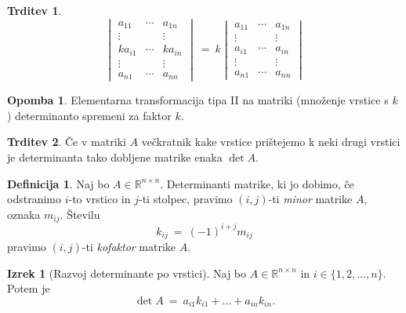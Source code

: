 \documentclass[11pt]{article}
\newcommand{\R}{\mathbb{R}}
\newcommand{\0}{\mathbf{0}}
\theoremstyle{definition}
\newtheorem{definicija}{Definicija}[section]
\theoremstyle{definition}
\newtheorem{trditev}{Trditev}[section]
\theoremstyle{definition}
\newtheorem{izrek}{Izrek}[section]
\theoremstyle{definition}
\newtheorem*{opomba}{Opomba}
\begin{document}
\begin{trditev}

$$\begin{vmatrix}
a_{11} & \cdots & a_{1n} \\
\vdots & ~ & \vdots \\
k a_{i1} & \cdots & k a_{in} \\
\vdots & ~ & \vdots \\
a_{n1} & \cdots & a_{nn}
\end{vmatrix} ~=~ k\begin{vmatrix}
a_{11} & \cdots & a_{1n} \\
\vdots & ~ & \vdots \\
a_{i1} & \cdots & a_{in} \\
\vdots & ~ & \vdots \\
a_{n1} & \cdots & a_{nn}
\end{vmatrix}$$

\end{trditev}
\vspace{0.5cm}

\begin{opomba}

Elementarna transformacija tipa II na matriki (množenje vrstice s $k$) determinanto spremeni za faktor $k$.

\end{opomba}
\vspace{0.5cm}

\begin{trditev}

Če v matriki $A$ večkratnik kake vrstice prištejemo k neki drugi vrstici je determinanta tako dobljene matrike enaka $\det A$.

\end{trditev}
\vspace{0.5cm}

\begin{definicija}

Naj bo $A \in \R^{n \times n}$. Determinanti matrike, ki jo dobimo, če odstranimo $i$-to vrstico in $j$-ti stolpec, pravimo $(i,j)$-ti \textit{minor} matrike $A$, oznaka $m_{ij}$. Številu
$$k_{ij} ~=~ (-1)^{i+j} m_{ij}$$
pravimo $(i,j)$-ti \textit{kofaktor} matrike $A$.

\end{definicija}
\vspace{0.5cm}

\begin{izrek}[Razvoj determinante po vrstici]

Naj bo $A \in \R^{n \times n}$ in $i \in \{1, 2, \ldots, n\}$. Potem je
$$\det A ~=~ a_{i1} k_{i1} + \ldots + a_{in} k_{in}.$$

\end{izrek}
\vspace{0.5cm}
\end{document}
